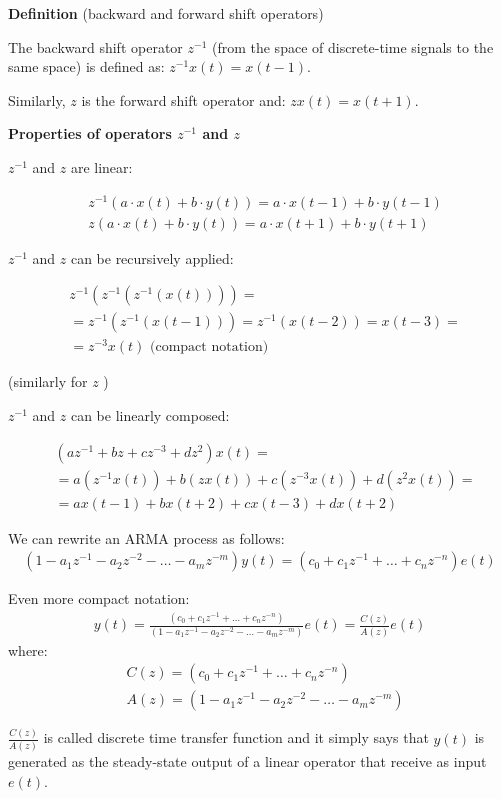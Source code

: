 \textbf{Definition} (backward and forward shift operators)

The backward shift operator $z^{-1}$ (from the space of discrete-time signals to the same space) is defined as: $z^{-1} x(t)=x(t-1)$.

Similarly, $z$ is the forward shift operator and: $z x(t)=x(t+1)$.

\textbf{Properties of operators $z^{-1}$ and $z$}

$z^{-1}$ and $z$ are linear:

\begin{align*}
	&z^{-1}(a \cdot x(t)+b \cdot y(t))=a \cdot x(t-1)+b \cdot y(t-1) \\
	&z(a \cdot x(t)+b \cdot y(t))=a \cdot x(t+1)+b \cdot y(t+1)
\end{align*}

$z^{-1}$ and $z$ can be recursively applied:

\begin{align*}
	&z^{-1}\left(z^{-1}\left(z^{-1}(x(t))\right)\right)= \\
	&=z^{-1}\left(z^{-1}(x(t-1))\right)=z^{-1}(x(t-2))=x(t-3)= \\
	&=z^{-3} x(t) \text { (compact notation) }
\end{align*}

(similarly for $z$ )

$z^{-1}$ and $z$ can be linearly composed:

\begin{align*}
	&\left(a z^{-1}+b z+c z^{-3}+d z^{2}\right) x(t)= \\
	&=a\left(z^{-1} x(t)\right)+b(z x(t))+c\left(z^{-3} x(t)\right)+d\left(z^{2} x(t)\right)= \\
	&=a x(t-1)+b x(t+2)+c x(t-3)+d x(t+2)
\end{align*}

We can rewrite an ARMA process as follows:
\begin{align*}
	\left(1-a_{1} z^{-1}-a_{2} z^{-2}-\ldots-a_{m} z^{-m}\right) y(t)=\left(c_{0}+c_{1} z^{-1}+\ldots+c_{n} z^{-n}\right) e(t)
\end{align*}

Even more compact notation:
\begin{align*}
	y(t)=\frac{\left(c_{0}+c_{1} z^{-1}+\ldots+c_{n} z^{-n}\right)}{\left(1-a_{1} z^{-1}-a_{2} z^{-2}-\ldots-a_{m} z^{-m}\right)} e(t)=\frac{C(z)}{A(z)} e(t)
\end{align*}
where:
\begin{align*}
	&C(z)=\left(c_{0}+c_{1} z^{-1}+\ldots+c_{n} z^{-n}\right) \\
	&A(z)=\left(1-a_{1} z^{-1}-a_{2} z^{-2}-\ldots-a_{m} z^{-m}\right)
\end{align*}

$\frac{C(z)}{A(z)}$ is called discrete time transfer function and it simply says that $y(t)$ is generated as the steady-state output of a linear operator that receive as input $e(t)$.